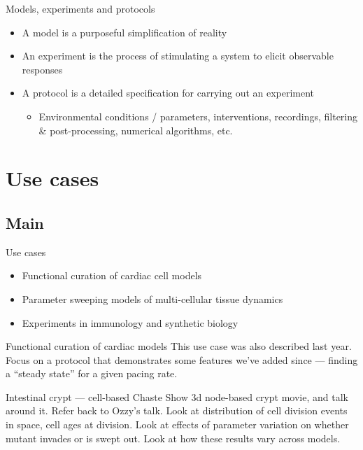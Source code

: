 \documentclass[t,xcolor={usenames,dvipsnames}]{beamer}
\newcommand{\subitem}[1]{\begin{itemize}[<.->]\item #1 \end{itemize}}
\begin{document}
\begin{frame}{Models, experiments and protocols}
\begin{itemize}
\item A \alert{model} is a purposeful simplification of reality
\item An \alert{experiment} is the process of stimulating a system to elicit observable responses
\item A \alert{protocol} is a detailed specification for carrying out an experiment
  \subitem{Environmental conditions / parameters, interventions, recordings, filtering \& post-processing, numerical algorithms, etc.}
\end{itemize}
\end{frame}


\section[Use cases]{Use cases}
\subsection*{Main}

\begin{frame}{Use cases}
\begin{itemize}
\item Functional curation of cardiac cell models
\item Parameter sweeping models of multi-cellular tissue dynamics
\item Experiments in immunology and synthetic biology
\end{itemize}
\end{frame}


\begin{frame}{Functional curation of cardiac models}
This use case was also described last year.
Focus on a protocol that demonstrates some features we've added since
--- finding a ``steady state'' for a given pacing rate.
\end{frame}


\begin{frame}{Intestinal crypt --- cell-based Chaste}
Show 3d node-based crypt movie, and talk around it.
Refer back to Ozzy's talk.
Look at distribution of cell division events in space, cell ages at division.
Look at effects of parameter variation on whether mutant invades or is swept out.
Look at how these results vary across models.
\end{frame}
\end{document}
